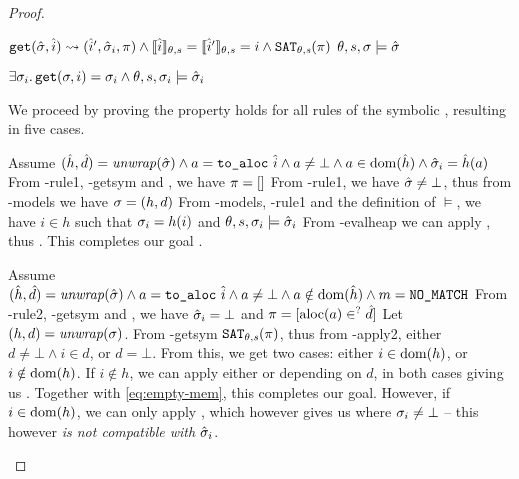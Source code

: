 \begin{proof}

\pfassume \begin{hypvlist}
 $\texttt{get}(\hat{\sigma},\hat{i})\rightsquigarrow(\hat{i}', \hat{\sigma}_i, \pi) \land \llbracket\hat{i}\rrbracket_{\theta,s}=\llbracket\hat{i}'\rrbracket_{\theta,s}=i \land \texttt{SAT}_{\mathit{\theta,s}}(\pi)$
 $\theta,s,\sigma\models\hat{\sigma}$
\end{hypvlist}
\pfprove \begin{goalvlist}
 $\exists \sigma_i \ldotp \texttt{get}(\sigma, i)=\sigma_i \land \theta,s,\sigma_i \models \hat{\sigma}_i$
\end{goalvlist}

We proceed by proving the property holds for all rules of the symbolic , resulting in five cases.


\begin{hypvlist}
 Assume $(\hat{h},\hat{d})={\operatorname{\mathit{unwrap}}}(\hat{\sigma}) \land a = \texttt{to\_aloc}~\hat{i} \land a \neq \bot \land a\in\operatorname{dom}(\hat{h}) \land \hat{\sigma}_i=\hat{h}(a)$
 From \hyp{rule1}, \hyp{getsym} and , we have $\pi=[]$
 From \hyp{rule1}, we have $\hat{\sigma}\neq\bot$, thus from \hyp{models} we have $\sigma=(h, d)$
 From \hyp{models}, \hyp{rule1} and the definition of $\models$, we have $i\in h$ such that $\sigma_i=h(i)$ and ${\theta,s,\sigma_i\models\hat{\sigma}_i}$
 From \hyp{evalheap} we can apply , thus . This completes our goal .
\end{hypvlist}


\begin{hypvlist}
 Assume $(\hat{h},\hat{d})={\operatorname{\mathit{unwrap}}}(\hat{\sigma}) \land a = \texttt{to\_aloc}~\hat{i} \land a \neq \bot \land a\notin\operatorname{dom}(\hat{h}) \land m=\texttt{NO\_MATCH}$
 From \hyp{rule2}, \hyp{getsym} and , we have $\hat{\sigma}_i=\bot$ and ${\pi=[\text{aloc}(a) \in^? \hat{d}]}$%
 Let $(h,d)={\operatorname{\mathit{unwrap}}}(\sigma)$.
 From \hyp{getsym} $\texttt{SAT}_{\mathit{\theta,s}}(\pi)$, thus from \hyp{apply2}, either $d\neq\bot\land i\in d$, or $d=\bot$.
 From this, we get two cases: either $i\in \operatorname{dom}(h)$, or $i\notin \operatorname{dom}(h)$.
 If $i\notin h$, we can apply either  or  depending on $d$, in both cases giving us . Together with \ref{eq:empty-mem}, this completes our goal.
 {\color{red}However, if $i\in \operatorname{dom}(h)$, we can only apply , which however gives us  where $\sigma_i\neq\bot$ -- this however \emph{is not compatible with $\hat{\sigma}_i$}.}
\end{hypvlist}


\end{proof}
